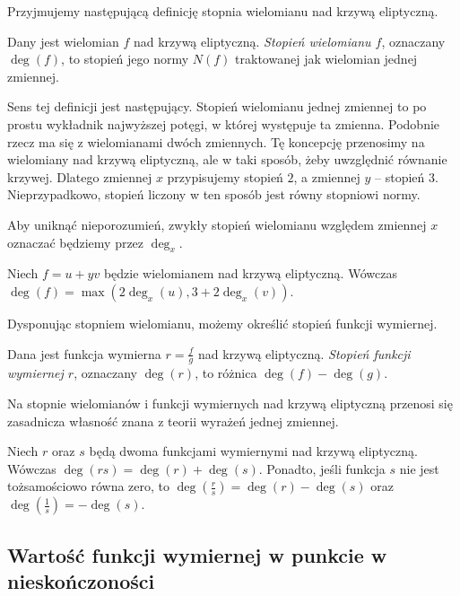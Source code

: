 Przyjmujemy następującą definicję stopnia wielomianu nad krzywą eliptyczną.

\begin{definition}
Dany jest wielomian $f$ nad krzywą eliptyczną.
\emph{Stopień wielomianu $f$},
oznaczany $\deg(f)$,
to stopień jego normy $N(f)$ traktowanej jak wielomian jednej zmiennej.
\end{definition}

Sens tej definicji jest następujący. Stopień wielomianu jednej zmiennej
to po prostu wykładnik najwyższej potęgi, w której występuje ta zmienna.
Podobnie rzecz ma się z wielomianami dwóch zmiennych.
Tę koncepcję przenosimy na wielomiany nad krzywą eliptyczną,
ale w taki sposób, żeby uwzględnić równanie krzywej.
Dlatego zmiennej $x$ przypisujemy stopień $2$,
a zmiennej $y$ -- stopień $3$.
Nieprzypadkowo, stopień liczony w ten sposób
jest równy stopniowi normy.

\begin{remark}
Aby uniknąć nieporozumień,
zwykły stopień wielomianu względem zmiennej $x$
oznaczać będziemy przez $\deg_x$.
\end{remark}

\begin{fact}
Niech $f = u + yv$ będzie wielomianem nad krzywą eliptyczną.
Wówczas $\deg(f) = \max(2\deg_x(u), 3 + 2\deg_x(v))$.
\end{fact}

Dysponując stopniem wielomianu, możemy określić stopień funkcji wymiernej.

\begin{definition}
Dana jest funkcja wymierna $r = \frac{f}{g}$ nad krzywą eliptyczną.
\emph{Stopień funkcji wymiernej $r$},
oznaczany $\deg(r)$,
to różnica $\deg(f) - \deg(g)$.
\end{definition}

Na stopnie wielomianów i funkcji wymiernych nad krzywą eliptyczną
przenosi się zasadnicza własność znana z teorii wyrażeń jednej zmiennej.

\begin{theorem}
Niech $r$ oraz $s$ będą dwoma funkcjami wymiernymi nad krzywą eliptyczną.
Wówczas $\deg(rs) = \deg(r) + \deg(s)$.
Ponadto, jeśli funkcja $s$ nie jest tożsamościowo równa zero,
to $\deg(\frac{r}{s}) = \deg(r) - \deg(s)$
oraz $\deg(\frac{1}{s}) = -\deg(s)$.
\end{theorem}

\subsection*{Wartość funkcji wymiernej w punkcie w nieskończoności}

